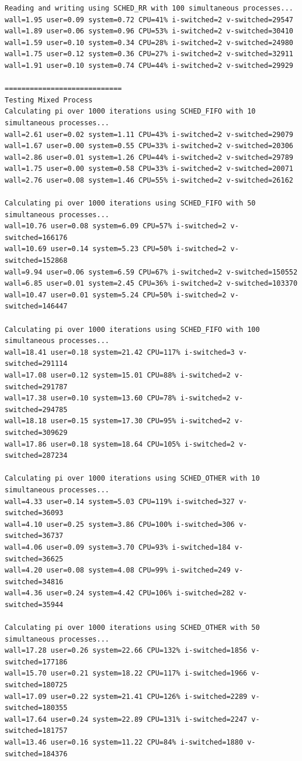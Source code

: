\documentclass[12pt]{article}
\begin{document}
\begin{small}
\begin{verbatim}
Reading and writing using SCHED_RR with 100 simultaneous processes...
wall=1.95 user=0.09 system=0.72 CPU=41% i-switched=2 v-switched=29547
wall=1.89 user=0.06 system=0.96 CPU=53% i-switched=2 v-switched=30410
wall=1.59 user=0.10 system=0.34 CPU=28% i-switched=2 v-switched=24980
wall=1.75 user=0.12 system=0.36 CPU=27% i-switched=2 v-switched=32911
wall=1.91 user=0.10 system=0.74 CPU=44% i-switched=2 v-switched=29929

============================
Testing Mixed Process
Calculating pi over 1000 iterations using SCHED_FIFO with 10 simultaneous processes...
wall=2.61 user=0.02 system=1.11 CPU=43% i-switched=2 v-switched=29079
wall=1.67 user=0.00 system=0.55 CPU=33% i-switched=2 v-switched=20306
wall=2.86 user=0.01 system=1.26 CPU=44% i-switched=2 v-switched=29789
wall=1.75 user=0.00 system=0.58 CPU=33% i-switched=2 v-switched=20071
wall=2.76 user=0.08 system=1.46 CPU=55% i-switched=2 v-switched=26162

Calculating pi over 1000 iterations using SCHED_FIFO with 50 simultaneous processes...
wall=10.76 user=0.08 system=6.09 CPU=57% i-switched=2 v-switched=166176
wall=10.69 user=0.14 system=5.23 CPU=50% i-switched=2 v-switched=152868
wall=9.94 user=0.06 system=6.59 CPU=67% i-switched=2 v-switched=150552
wall=6.85 user=0.01 system=2.45 CPU=36% i-switched=2 v-switched=103370
wall=10.47 user=0.01 system=5.24 CPU=50% i-switched=2 v-switched=146447

Calculating pi over 1000 iterations using SCHED_FIFO with 100 simultaneous processes...
wall=18.41 user=0.18 system=21.42 CPU=117% i-switched=3 v-switched=291114
wall=17.08 user=0.12 system=15.01 CPU=88% i-switched=2 v-switched=291787
wall=17.38 user=0.10 system=13.60 CPU=78% i-switched=2 v-switched=294785
wall=18.18 user=0.15 system=17.30 CPU=95% i-switched=2 v-switched=309629
wall=17.86 user=0.18 system=18.64 CPU=105% i-switched=2 v-switched=287234

Calculating pi over 1000 iterations using SCHED_OTHER with 10 simultaneous processes...
wall=4.33 user=0.14 system=5.03 CPU=119% i-switched=327 v-switched=36093
wall=4.10 user=0.25 system=3.86 CPU=100% i-switched=306 v-switched=36737
wall=4.06 user=0.09 system=3.70 CPU=93% i-switched=184 v-switched=36625
wall=4.20 user=0.08 system=4.08 CPU=99% i-switched=249 v-switched=34816
wall=4.36 user=0.24 system=4.42 CPU=106% i-switched=282 v-switched=35944

Calculating pi over 1000 iterations using SCHED_OTHER with 50 simultaneous processes...
wall=17.28 user=0.26 system=22.66 CPU=132% i-switched=1856 v-switched=177186
wall=15.70 user=0.21 system=18.22 CPU=117% i-switched=1966 v-switched=180725
wall=17.09 user=0.22 system=21.41 CPU=126% i-switched=2289 v-switched=180355
wall=17.64 user=0.24 system=22.89 CPU=131% i-switched=2247 v-switched=181757
wall=13.46 user=0.16 system=11.22 CPU=84% i-switched=1880 v-switched=184376


\end{verbatim}
\end{small}
\end{document}
